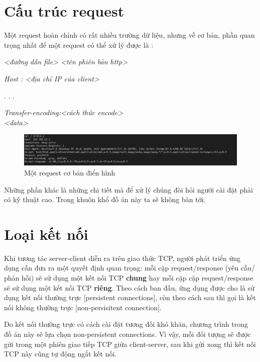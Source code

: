 \documentclass[14pt]{extreport}
\begin{document}
\section{Cấu trúc request}
Một request hoàn chỉnh có rất nhiều trường dữ liệu, nhưng về cơ bản, phần quan trọng nhất để một request có thể xử lý được là :

{\it <tên method> <đường dẫn file> <tên phiên bản http>}

{\it Host : <địa chỉ IP của client>}

.
.
.

{\it Transfer-encoding:<cách thức encode>}\\

{\it <data>}

\begin{center}
    \begin{figure}[H]
    \begin{center}
     \includegraphics[scale=.8]{client request.PNG}
    \end{center}
    \caption{Một request cơ bản điển hình}
    \end{figure}
\end{center}

Những phần khác là những chi tiết mà để xử lý chúng đòi hỏi người cài đặt phải có kỹ thuật cao. Trong khuôn khổ đồ án này ta sẽ không bàn tới.
\section{Loại kết nối}
\cite{1} Khi tương tác server-client diễn ra trên giao thức TCP, người phát triển ứng dụng cần đưa ra một quyết định quan trọng: mỗi cặp request/response (yêu cầu/ phản hồi) sẽ sử dụng một kết nối TCP {\bf chung} hay mỗi cặp cặp request/response sẽ sử dụng một kết nối TCP {\bf riêng}. Theo cách ban đầu, ứng dụng được cho là sử dụng kết nối thường trực [persistent connections], còn theo cách sau thì gọi là kết nối không thường trực [non-persisitent connection].

Do kết nối thường trực có cách cài đặt tương đối khó khăn, chương trình trong đồ án này sẽ lựa chọn non-persistent connections. Vì vậy, mỗi đối tượng sẽ được gửi trong một phiên giao tiếp TCP giữa client-server, sau khi gửi xong thì kết nối TCP này cũng tự động ngắt kết nối.
\end{document}
